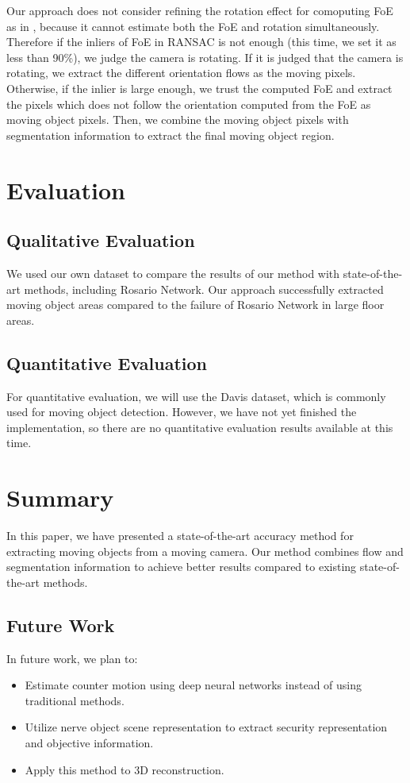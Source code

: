 \documentclass[10pt, twocolumn]{article}
\begin{document}
Our approach does not consider refining the rotation effect for comoputing FoE as in \cite{hu2000}, because it cannot estimate both the FoE and rotation simultaneously.
Therefore if the inliers of FoE in RANSAC is not enough (this time, we set it as less than 90\%), we judge the camera is rotating.
If it is judged that the camera is rotating, we extract the different orientation flows as the moving pixels.
Otherwise, if the inlier is large enough, we trust the computed FoE and extract the pixels which does not follow the orientation computed from the FoE as moving object pixels.
Then, we combine the moving object pixels with segmentation information to extract the final moving object region.


\section{Evaluation}

\subsection{Qualitative Evaluation}
We used our own dataset to compare the results of our method with state-of-the-art methods, including Rosario Network. Our approach successfully extracted moving object areas compared to the failure of Rosario Network in large floor areas.

\subsection{Quantitative Evaluation}
For quantitative evaluation, we will use the Davis dataset, which is commonly used for moving object detection.
However, we have not yet finished the implementation, so there are no quantitative evaluation results available at this time.


\section{Summary}
In this paper, we have presented a state-of-the-art accuracy method for extracting moving objects from a moving camera.
Our method combines flow and segmentation information to achieve better results compared to existing state-of-the-art methods.

\subsection{Future Work}
In future work, we plan to:

\begin{itemize}
  \item Estimate counter motion using deep neural networks instead of using traditional methods.
  \item Utilize nerve object scene representation to extract security representation and objective information.
  \item Apply this method to 3D reconstruction.
\end{itemize}



\end{document}
